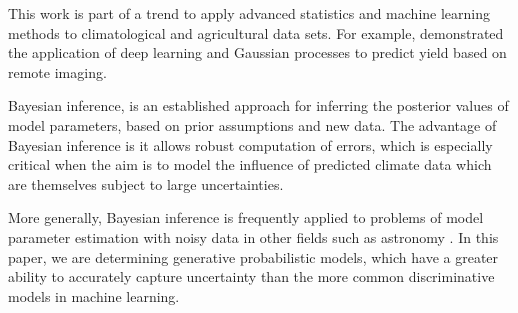 \documentclass[12pt]{iopart}
\newcommand{\remove}[1]{}
\newcommand{\add}[1]{#1}
\begin{document}








This work is part of a trend to apply advanced statistics and machine learning methods to climatological and agricultural data sets. For example, \citet{you:2017} demonstrated the application of deep learning and Gaussian processes to predict yield based on remote imaging. 

Bayesian inference, is an established approach for inferring the posterior values of model parameters, based on prior assumptions and new data. The advantage of Bayesian inference is it allows robust computation of errors, which is especially critical when the aim is to model the influence of predicted climate data which are themselves subject to large uncertainties. 


More generally, Bayesian inference is frequently applied to problems of model parameter estimation with noisy data in other fields such as astronomy \citep{Hurley:2016}. In this paper, we are determining generative probabilistic models, which have a greater ability to accurately capture uncertainty than the more common discriminative models in machine learning.  
\end{document}
